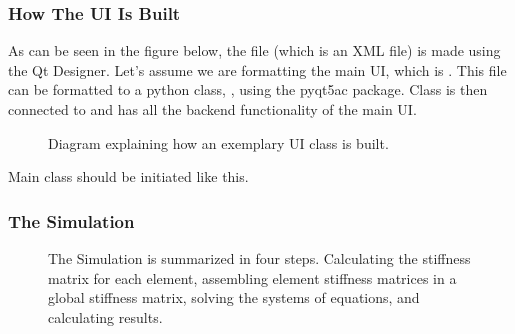 \documentclass[letterpaper,10pt,english]{sphinxmanual}
\begin{document}
\begin{figure}[htbp]
\centering

\noindent{}
\end{figure}


\subsubsection{How The UI Is Built}
\label{\detokenize{implementation:how-the-ui-is-built}}
As can be seen in the figure below, the  file (which is an XML file) is made using the Qt Designer.
Let’s assume we are formatting the main UI, which is .
This file can be formatted to a python class, , using the pyqt5ac package. Class  is
then connected to  and has all the backend functionality of the main UI.

\begin{figure}[htbp]
\centering
\capstart

\noindent{}
\caption{Diagram explaining how an exemplary UI class is built.}\label{\detokenize{implementation:id4}}\end{figure}

Main class should be initiated like this.

\begin{sphinxVerbatim}[commandchars=\\\{\}]
 
          
\end{sphinxVerbatim}


\subsubsection{The Simulation}
\label{\detokenize{implementation:the-simulation}}
\begin{figure}[htbp]
\centering
\capstart

\noindent{}
\caption{The Simulation is summarized in four steps. Calculating the stiffness matrix for each element, assembling
element stiffness matrices in a global stiffness matrix, solving the systems of equations, and calculating
results.}\label{\detokenize{implementation:id5}}\end{figure}
\end{document}
